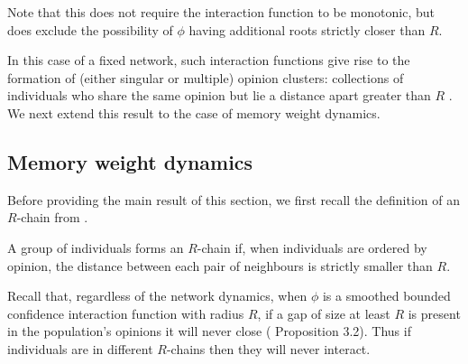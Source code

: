 \documentclass{article}
\begin{document}
Note that this does not require the interaction function to be monotonic, but does exclude the possibility of $\phi$ having additional roots strictly closer than $R$. 

In this case of a fixed network, such interaction functions give rise to the formation of (either singular or multiple) opinion clusters: collections of individuals who share the same opinion but lie a distance apart greater than $R$ \cite{nugent2023evolving}.  We next extend this result to the case of memory weight dynamics. 

\subsection{Memory weight dynamics}

Before providing the main result of this section, we first recall the definition of an $R$-chain from \cite{NugentGomesWolfram2024}.

\begin{definition}
    A group of individuals forms an $R$-chain if, when individuals are ordered by opinion, the distance between each pair of neighbours is strictly smaller than $R$. 
\end{definition}

Recall that, regardless of the network dynamics, when $\phi$ is a smoothed bounded confidence interaction function with radius $R$, if a gap of size at least $R$ is present in the population's opinions it will never close (\cite{nugent2023evolving} Proposition 3.2). Thus if individuals are in different $R$-chains then they will never interact. 
\end{document}

